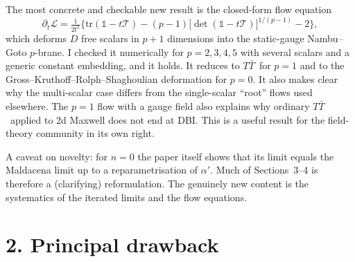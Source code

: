 \documentclass[11pt]{article}
\newcommand{\TT}{$T\bar T$}
\begin{document}
The most concrete and checkable new result is the closed-form flow equation
\[
\partial_t\mathcal L=\tfrac{1}{2t^2}\Big\{\mathrm{tr}(\mathbb 1-t\mathcal T)-(p-1)\big[\det(\mathbb 1-t\mathcal T)\big]^{1/(p-1)}-2\Big\},
\]
which deforms $D$ free scalars in $p{+}1$ dimensions into the static-gauge Nambu--Goto $p$-brane. I checked it numerically for $p=2,3,4,5$ with several scalars and a generic constant embedding, and it holds. It reduces to \TT\ for $p=1$ and to the Gross--Kruthoff--Rolph--Shaghoulian deformation for $p=0$. It also makes clear why the multi-scalar case differs from the single-scalar ``root'' flows used elsewhere. The $p=1$ flow with a gauge field also explains why ordinary \TT\ applied to 2d Maxwell does not end at DBI. This is a useful result for the field-theory community in its own right.

A caveat on novelty: for $n=0$ the paper itself shows that its limit equals the Maldacena limit up to a reparametrisation of $\alpha'$. Much of Sections~3--4 is therefore a (clarifying) reformulation. The genuinely new content is the systematics of the iterated limits and the flow equations.

\section*{2. Principal drawback}
\end{document}
